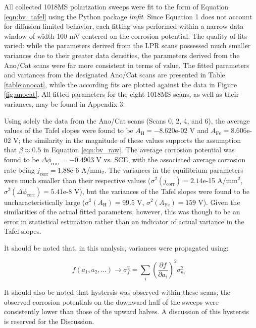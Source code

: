 All collected 1018MS polarization sweeps were fit to the form of Equation \ref{eqn:bv_tafel} using the Python package \textit{lmfit}.\cite{lmfit}  Since Equation 1 does not account for diffusion-limited behavior, each fitting was performed within a narrow data window of width 100 mV centered on the corrosion potential.  The quality of fits varied: while the parameters derived from the LPR scans possessed much smaller variances due to their greater data densities, the parameters derived from the Ano/Cat scans were far more consistent in terms of value.  The fitted parameters and variances from the designated Ano/Cat scans are presented in Table \ref{table:anocat}, while the according fits are plotted against the data in Figure \ref{fig:anocat}.  All fitted parameters for the eight 1018MS scans, as well as their variances, may be found in Appendix 3.

Using solely the data from the Ano/Cat scans (Scans 0, 2, 4, and 6), the average values of the Tafel slopes were found to be $A_{\text{H}} = -8.620$e-02 V and $A_{\text{Fe}} = 8.606$e-02 V; the similarity in the magnitude of these values supports the assumption that $\beta \approx 0.5$ in Equation \ref{eqn:bv_raw}.  The average corrosion potential was found to be $\Delta \phi_{\text{corr}} = -0.4903$ V vs. SCE, with the associated average corrosion rate being $j_{\text{corr}} = 1.88$e-6 A/mm$_2$.  The variances in the equilibrium parameters were much smaller than their respective values ($\sigma^2(j_{\text{corr}}) = 2.14$e-15 A/mm$^2$, $\sigma^2(\Delta \phi_{\text{corr}}) = 5.41$e-8 V), but the variances of the Tafel slopes were found to be uncharacteristically large ($\sigma^2(A_{\text{H}}) = 99.5$ V, $\sigma^2(A_{\text{Fe}}) = 159$ V).  Given the similarities of the actual fitted parameters, however, this was though to be an error in statistical estimation rather than an indicator of actual variance in the Tafel slopes.

It should be noted that, in this analysis, variances were propagated using:

	\begin{equation}
		f(a_1, a_2, ...) \rightarrow \sigma^2_f = \sum_i \left( \frac{\partial f}{\partial a_i} \right)^2 \sigma^2_{a_i}
		\label{eqn:se}
	\end{equation}

It should also be noted that hystersis was observed within these scans; the observed corrosion potentials on the downward half of the sweeps were consistently lower than those of the upward halves.  A discussion of this hystersis is reserved for the Discussion.

